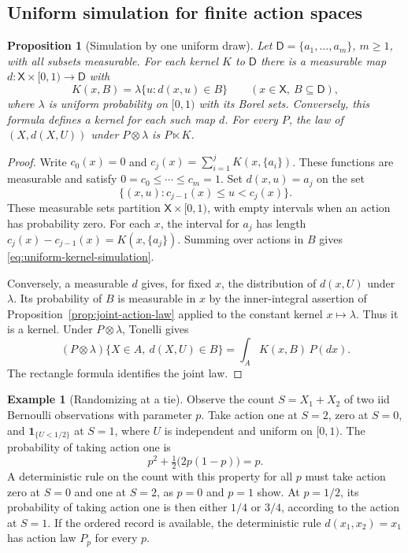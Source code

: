 \documentclass[11pt,oneside]{book}
\newtheorem{proposition}[theorem]{Proposition}
\theoremstyle{definition}
\newtheorem{example}[theorem]{Example}
\theoremstyle{remark}
\begin{document}
\subsection{Uniform simulation for finite action spaces}
\label{subsec:finite-rule-simulation}

\begin{proposition}[Simulation by one uniform draw]
\label{prop:finite-kernel-simulation}
Let $\mathsf D=\{a_1,\ldots,a_m\}$, $m\geq1$, with all subsets measurable.
For each kernel $K$ to $\mathsf D$ there is a measurable map
$d:\mathsf X\times[0,1)\to\mathsf D$ with
\begin{equation}
K(x,B)=\lambda\{u:d(x,u)\in B\}
\qquad(x\in\mathsf X,\ B\subseteq\mathsf D),
\label{eq:uniform-kernel-simulation}
\end{equation}
where $\lambda$ is uniform probability on $[0,1)$ with its Borel sets.
Conversely, this formula defines a kernel for each such map $d$.
For every $P$, the law of $(X,d(X,U))$ under $P\otimes\lambda$ is
$P\ltimes K$.
\end{proposition}
\begin{proof}
Write $c_0(x)=0$ and $c_j(x)=\sum_{i=1}^jK(x,\{a_i\})$. These functions
are measurable and satisfy $0=c_0\leq\cdots\leq c_m=1$. Set $d(x,u)=a_j$
on the set
\[
\{(x,u):c_{j-1}(x)\leq u<c_j(x)\}.
\]
These measurable sets partition $\mathsf X\times[0,1)$, with empty
intervals when an action has probability zero. For each $x$, the interval
for $a_j$ has length $c_j(x)-c_{j-1}(x)=K(x,\{a_j\})$. Summing over actions
in $B$ gives \eqref{eq:uniform-kernel-simulation}.

Conversely, a measurable $d$ gives, for fixed $x$, the distribution
of $d(x,U)$ under $\lambda$. Its probability of $B$ is measurable in $x$
by the inner-integral assertion of Proposition~\ref{prop:joint-action-law}
applied to the constant kernel $x\mapsto\lambda$. Thus it is a kernel.
Under $P\otimes\lambda$, Tonelli gives
\[
(P\otimes\lambda)\{X\in A,\ d(X,U)\in B\}
=\int_A K(x,B)\,P(dx).
\]
The rectangle formula identifies the joint law.
\end{proof}

\begin{example}[Randomizing at a tie]
\label{ex:count-tie-rule}
Observe the count $S=X_1+X_2$ of two iid Bernoulli observations with
parameter $p$. Take action one at $S=2$, zero at $S=0$, and $\mathbf 1_{\{U<1/2\}}$ at
$S=1$, where $U$ is independent and uniform on $[0,1)$.
The probability of taking action one is
\[
p^2+\tfrac12\bigl(2p(1-p)\bigr)=p.
\]
A deterministic rule on the count with this property for all $p$ must take
action zero at $S=0$ and one at $S=2$, as $p=0$ and $p=1$ show. At $p=1/2$,
its probability of taking action one is then either $1/4$ or $3/4$, according
to the action at $S=1$. If the ordered record is available, the deterministic
rule $d(x_1,x_2)=x_1$ has action law $P_p$ for every $p$.
\end{example}
\end{document}
